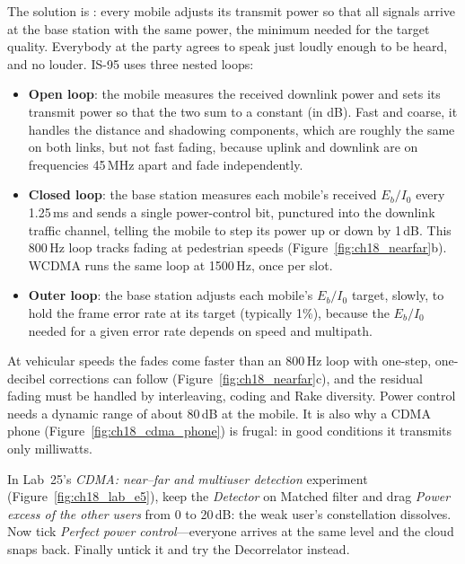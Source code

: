 The solution is : every mobile adjusts its transmit power so that all
signals arrive at the base station with the same power, the minimum needed for the target
quality. Everybody at the party agrees to speak just loudly enough to be heard, and no louder.
IS-95 uses three nested loops:
\begin{itemize}
\item \textbf{Open loop}: the mobile measures the received downlink power and sets its transmit
power so that the two sum to a constant (in dB). Fast and coarse, it handles the distance
and shadowing components, which are roughly the same on both links, but not fast fading,
because uplink and downlink are on frequencies 45\,MHz apart and fade independently.
\item \textbf{Closed loop}: the base station measures each mobile's received $E_b/I_0$ every
1.25\,ms and sends a single power-control bit, punctured into the downlink traffic channel,
telling the mobile to step its power up or down by 1\,dB. This 800\,Hz loop tracks fading
at pedestrian speeds (Figure~\ref{fig:ch18_nearfar}b). WCDMA runs the same loop at
1500\,Hz, once per slot.
\item \textbf{Outer loop}: the base station adjusts each mobile's $E_b/I_0$ target, slowly,
to hold the frame error rate at its target (typically 1\%), because the $E_b/I_0$ needed for
a given error rate depends on speed and multipath.
\end{itemize}
At vehicular speeds the fades come faster than an 800\,Hz loop with one-step, one-decibel
corrections can follow (Figure~\ref{fig:ch18_nearfar}c), and the residual fading must be
handled by interleaving, coding and Rake diversity. Power control needs a dynamic range of
about 80\,dB at the mobile. It is also why a CDMA phone (Figure~\ref{fig:ch18_cdma_phone}) is frugal: in good conditions it
transmits only milliwatts.

\begin{tryit}
In Lab~25's \emph{CDMA: near--far and multiuser detection} experiment
(Figure~\ref{fig:ch18_lab_e5}), keep the \emph{Detector} on
Matched filter and drag \emph{Power excess of the other users} from 0 to 20\,dB: the weak user's
constellation dissolves. Now tick \emph{Perfect power control}---everyone arrives at the same
level and the cloud snaps back. Finally untick it and try the Decorrelator instead.
\end{tryit}


